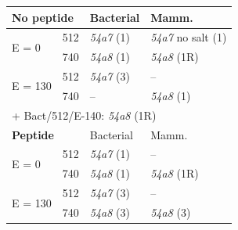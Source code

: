 \begin{figure}[h]%
\centering
 \def\arraystretch{1.6}
\begin{tabular}{ll|l|l}
\hline
 \multicolumn{2}{l|}{\textbf{No peptide}} & Bacterial & Mamm. \\
 \hline
 \multirow{2}{*}{E = 0} & 512 & \emph{54a7} (1) & \emph{54a7} no salt (1) \\
 & 740 & \emph{54a8} (1) & \emph{54a8} (1R) \\
 \hline
 \multirow{2}{*}{E = 130} & 512 & \emph{54a7} (3) & -- \\
 & 740 & -- & \emph{54a8} (1) \\
 \hline
 \multicolumn{4}{l}{+ Bact/512/E-140: \emph{54a8} (1R)} \\
 \hline
 \multicolumn{2}{l|}{\textbf{Peptide}} & Bacterial & Mamm. \\
 \hline
 \multirow{2}{*}{E = 0} & 512 & \emph{54a7} (1) & -- \\
 & 740 & \emph{54a8} (1) & \emph{54a8} (1R) \\
 \hline
 \multirow{2}{*}{E = 130} & 512 & \emph{54a7} (3) & -- \\
 & 740 & \emph{54a8} (3) & \emph{54a8} (3) \\
 \hline
 \end{tabular}
\label{table:membrane_simulations_force_field}
\end{figure}
